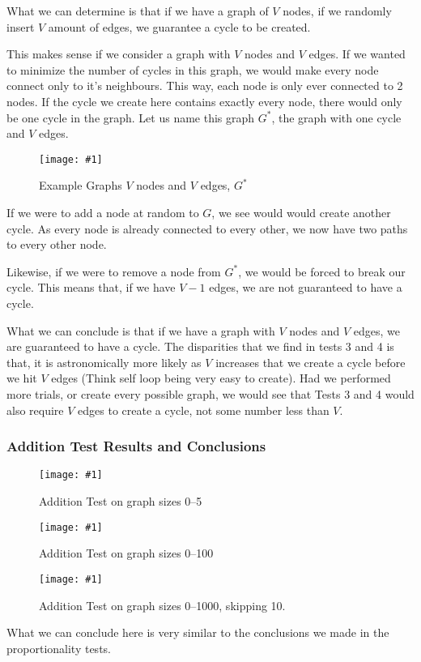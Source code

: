 \documentclass[12pt]{article}
\newcommand{\firgureBuffered}[2]
{
    \begin{figure}[ht!]
        \centering
        \texttt{[image: \#1]}
        \caption{#2}
    \end{figure}
}
\begin{document}
What we can determine is that if we have a graph of $V$ nodes, if we randomly insert $V$ amount of edges, we guarantee a cycle to be created.

This makes sense if we consider a graph with $V$ nodes and $V$ edges. If we wanted to minimize the number of cycles in this graph, we would make every node connect only to it's neighbours. This way, each node is only ever connected to 2 nodes. If the cycle we create here contains exactly every node, there would only be one cycle in the graph.
Let us name this graph $G^{*}$, the graph with one cycle and $V$ edges.

\FloatBarrier{}
\firgureBuffered{images/experiment1/exp1_exp1.png}{Example Graphs $V$ nodes and $V$ edges, $G^{*}$}
\FloatBarrier{}

If we were to add a node at random to $G$, we see would would create another cycle. As every node is already connected to every other, we now have two paths to every other node.

Likewise, if we were to remove a node from $G^{*}$, we would be forced to break our cycle. This means that, if we have $V-1$ edges, we are not guaranteed to have a cycle.

What we can conclude is that if we have a graph with $V$ nodes and $V$ edges, we are guaranteed to have a cycle. The disparities that we find in tests 3 and 4 is that, it is astronomically more likely as $V$ increases that we create a cycle before we hit $V$ edges (Think self loop being very easy to create). Had we performed more trials, or create every possible graph, we would see that Tests 3 and 4 would also require $V$ edges to create a cycle, not some number less than $V$.

\subsubsection{Addition Test Results and Conclusions}

\FloatBarrier{}
\firgureBuffered{images/experiment1/exp1_e.png}{Addition Test on graph sizes 0--5}
\firgureBuffered{images/experiment1/exp1_f.png}{Addition Test on graph sizes 0--100}
\firgureBuffered{images/experiment1/exp1_g.png}{Addition Test on graph sizes 0--1000, skipping 10.}
\FloatBarrier{}

What we can conclude here is very similar to the conclusions we made in the proportionality tests.
\end{document}
